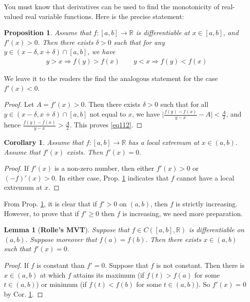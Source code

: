 \documentclass[12pt,b5paper,notitlepage]{article}
\theoremstyle{definition}
\theoremstyle{plain}
\newtheorem{pp}[df]{Proposition}
\newtheorem{co}[df]{Corollary}
\newtheorem{lm}[df]{Lemma}
\newcommand{\Rbb}{\mathbb R}
\newcommand{\dps}{\displaystyle}
\numberwithin{equation}{section}
\begin{document}
You must know that derivatives can be used to find the monotonicity of real-valued real variable functions. Here is the precise statement:

\begin{pp}\label{lb324}
Assume that $f:[a,b]\rightarrow\Rbb$ is differentiable at $x\in[a,b]$, and $f'(x)>0$. Then there exists $\delta>0$ such that for any $y\in (x-\delta,x+\delta)\cap[a,b]$, we have
\begin{gather}
y>x\Rightarrow f(y)>f(x)\qquad y<x\Rightarrow f(y)<f(x)   \label{eq112}
\end{gather}
\end{pp}
We leave it to the readers the find the analogous statement for the case $f'(x)<0$.

\begin{proof}
Let $A=f'(x)>0$. Then there exists $\delta>0$ such that for all $y\in (x-\delta,x+\delta)\cap[a,b]$ not equal to $x$, we have $\dps\Big|\frac{f(y)-f(x)}{y-x}-A \Big|<\frac A2$, and hence $\dps\frac{f(y)-f(x)}{y-x}>\frac A2$. This proves \eqref{eq112}.
\end{proof}


\begin{co}\label{lb325}
Assume that $f:[a,b]\rightarrow\Rbb$ has a local extremum at $x\in (a,b)$. Assume that $f'(x)$ exists. Then $f'(x)=0$.
\end{co}
\begin{proof}
If $f'(x)$ is a non-zero number, then either $f'(x)>0$ or $(-f)'(x)>0$. In either case, Prop. \ref{lb324} indicates that $f$ cannot have a local extremum at $x$.
\end{proof}




From Prop. \ref{lb324}, it is clear that if $f'>0$ on $(a,b)$, then $f$ is strictly increasing. However, to prove that if $f'\geq0$ then $f$ is increasing, we need more preparation.


\begin{lm}[\textbf{Rolle's MVT}] 
Suppose that $f\in C([a,b],\Rbb)$ is differentiable on $(a,b)$. Suppose moreover that $f(a)=f(b)$. Then there exists $x\in (a,b)$ such that $f'(x)=0$.
\end{lm}


\begin{proof}
If $f$ is constant than $f'=0$. Suppose that $f$ is not constant. Then there is $x\in(a,b)$ at which $f$ attains its maximum (if $f(t)>f(a)$ for some $t\in(a,b)$) or minimum (if $f(t)<f(b)$ for some $t\in(a,b)$). So $f'(x)=0$ by Cor. \ref{lb325}.
\end{proof}
\end{document}
